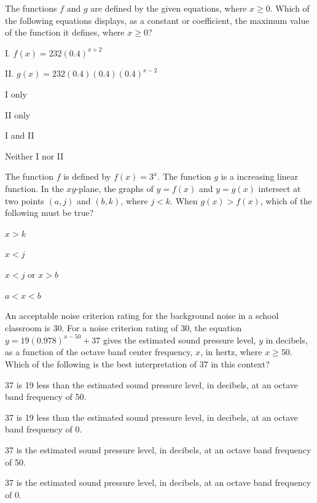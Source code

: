 \vfill
\noindent\begin{minipage}{\linewidth}
\par\smallskip
The functions $f$ and $g$ are defined by the given equations, where $x\ge0$. Which of the following equations displays, as a constant or coefficient, the maximum value of the function it defines, where $x\ge0$?\par\smallskip I. $f(x)=232(0.4)^{x+2}$\par II. $g(x)=232(0.4)(0.4)(0.4)^{x-2}$
\begin{satchoices}
  \item[A)] I only
  \item[B)] II only
  \item[C)] I and II
  \item[D)] Neither I nor II
\end{satchoices}
\end{minipage}
\vfill
\clearpage
\noindent\begin{minipage}{\linewidth}
\par\smallskip
The function $f$ is defined by $f(x)=3^x$. The function $g$ is a increasing linear function. In the $xy$-plane, the graphs of $y=f(x)$ and $y=g(x)$ intersect at two points $(a,j)$ and $(b,k)$, where $j<k$. When $g(x)>f(x)$, which of the following must be true?
\begin{satchoices}
  \item[A)] $x>k$
  \item[B)] $x<j$
  \item[C)] $x<j$ or $x>b$
  \item[D)] $a<x<b$
\end{satchoices}
\end{minipage}
\vfill
\noindent\begin{minipage}{\linewidth}
\par\smallskip
An acceptable noise criterion rating for the background noise in a school classroom is 30. For a noise criterion rating of 30, the equation $y=19(0.978)^{x-50}+37$ gives the estimated sound pressure level, $y$ in decibels, as a function of the octave band center frequency, $x$, in hertz, where $x\ge50$. Which of the following is the best interpretation of 37 in this context?
\begin{satchoices}
  \item[A)] 37 is 19 less than the estimated sound pressure level, in decibels, at an octave band frequency of 50.
  \item[B)] 37 is 19 less than the estimated sound pressure level, in decibels, at an octave band frequency of 0.
  \item[C)] 37 is the estimated sound pressure level, in decibels, at an octave band frequency of 50.
  \item[D)] 37 is the estimated sound pressure level, in decibels, at an octave band frequency of 0.
\end{satchoices}
\end{minipage}
